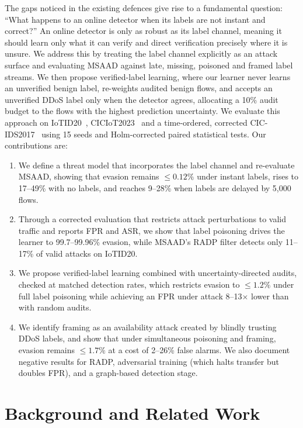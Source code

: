 \documentclass[conference]{IEEEtran}
\begin{document}
The gaps noticed in the existing defences give rise to a fundamental question:
``What happens to an online detector when its labels are not instant and
correct?'' An online detector is only as robust as its label channel, meaning
it should learn only what it can verify and direct verification precisely where
it is unsure. We address this by treating the label channel explicitly as an
attack surface and evaluating MSAAD against late, missing, poisoned and framed
label streams. We then propose verified-label learning, where our learner never
learns an unverified benign label, re-weights audited benign flows, and accepts
an unverified DDoS label only when the detector agrees, allocating a 10\% audit
budget to the flows with the highest prediction uncertainty. We evaluate this
approach on IoTID20~\cite{ullah2020iotid20}, CICIoT2023~\cite{neto2023ciciot}
and a time-ordered, corrected CIC-IDS2017~\cite{engelen2021troubleshooting}
using 15 seeds and Holm-corrected paired statistical tests. Our contributions
are:
\begin{enumerate}
\item We define a threat model that incorporates the label channel and
re-evaluate MSAAD, showing that evasion remains $\le 0.12\%$ under instant
labels, rises to 17--49\% with no labels, and reaches 9--28\% when labels are
delayed by 5{,}000 flows.
\item Through a corrected evaluation that restricts attack perturbations to
valid traffic and reports FPR and ASR, we show that label poisoning drives the
learner to 99.7--99.96\% evasion, while MSAAD's RADP filter detects only
11--17\% of valid attacks on IoTID20.
\item We propose verified-label learning combined with uncertainty-directed
audits, checked at matched detection rates, which restricts evasion to
$\le 1.2\%$ under full label poisoning while achieving an FPR under attack
8--13$\times$ lower than with random audits.
\item We identify framing as an availability attack created by blindly trusting
DDoS labels, and show that under simultaneous poisoning and framing, evasion
remains $\le 1.7\%$ at a cost of 2--26\% false alarms. We also document
negative results for RADP, adversarial training (which halts transfer but
doubles FPR), and a graph-based detection stage.
\end{enumerate}

\section{Background and Related Work}\label{sec:related}
\end{document}
